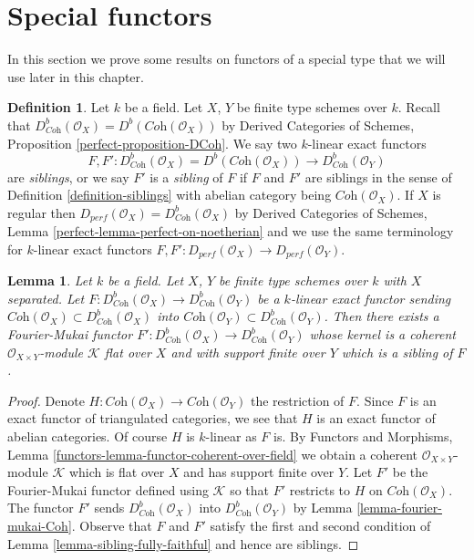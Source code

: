 \documentclass{stacks-project}
\theoremstyle{plain}
\newtheorem{lemma}[subsection]{Lemma}
\theoremstyle{definition}
\newtheorem{definition}[subsection]{Definition}
\theoremstyle{remark}
\numberwithin{equation}{subsection}
\begin{document}
\section{Special functors}
\label{section-special-functors}

\noindent
In this section we prove some results on functors of a special type
that we will use later in this chapter.

\begin{definition}
\label{definition-siblings-geometric}
Let $k$ be a field. Let $X$, $Y$ be finite type schemes over $k$.
Recall that
$D^b_{\textit{Coh}}(\mathcal{O}_X) = D^b(\textit{Coh}(\mathcal{O}_X))$
by Derived Categories of Schemes, Proposition \ref{perfect-proposition-DCoh}.
We say two $k$-linear exact functors
$$
F, F' :
D^b_{\textit{Coh}}(\mathcal{O}_X) = D^b(\textit{Coh}(\mathcal{O}_X))
\longrightarrow
D^b_{\textit{Coh}}(\mathcal{O}_Y)
$$
are {\it siblings}, or we say $F'$ is a {\it sibling} of $F$ if $F$ and $F'$
are siblings in the sense of Definition \ref{definition-siblings}
with abelian category being $\textit{Coh}(\mathcal{O}_X)$.
If $X$ is regular then
$D_{perf}(\mathcal{O}_X) = D^b_{\textit{Coh}}(\mathcal{O}_X)$ by
Derived Categories of Schemes, Lemma \ref{perfect-lemma-perfect-on-noetherian}
and we use the same terminology for $k$-linear exact functors
$F, F' : D_{perf}(\mathcal{O}_X) \to D_{perf}(\mathcal{O}_Y)$.
\end{definition}

\begin{lemma}
\label{lemma-exact-functor-preserving-Coh}
Let $k$ be a field. Let $X$, $Y$ be finite type schemes over $k$ with
$X$ separated. Let
$F : D^b_{\textit{Coh}}(\mathcal{O}_X) \to D^b_{\textit{Coh}}(\mathcal{O}_Y)$
be a $k$-linear exact functor sending
$\textit{Coh}(\mathcal{O}_X) \subset D^b_{\textit{Coh}}(\mathcal{O}_X)$
into
$\textit{Coh}(\mathcal{O}_Y) \subset D^b_{\textit{Coh}}(\mathcal{O}_Y)$.
Then there exists a Fourier-Mukai functor
$F' : D^b_{\textit{Coh}}(\mathcal{O}_X) \to D^b_{\textit{Coh}}(\mathcal{O}_Y)$
whose kernel is a coherent $\mathcal{O}_{X \times Y}$-module $\mathcal{K}$
flat over $X$ and with support finite over $Y$ which is a sibling of $F$.
\end{lemma}

\begin{proof}
Denote $H : \textit{Coh}(\mathcal{O}_X) \to \textit{Coh}(\mathcal{O}_Y)$
the restriction of $F$. Since $F$ is an exact functor of triangulated
categories, we see that $H$ is an exact functor of abelian categories.
Of course $H$ is $k$-linear as $F$ is. By
Functors and Morphisms, Lemma \ref{functors-lemma-functor-coherent-over-field}
we obtain a coherent $\mathcal{O}_{X \times Y}$-module
$\mathcal{K}$ which is flat over $X$ and has support finite over $Y$.
Let $F'$ be the Fourier-Mukai functor defined using $\mathcal{K}$
so that $F'$ restricts to $H$ on $ \textit{Coh}(\mathcal{O}_X)$.
The functor $F'$ sends $D^b_{\textit{Coh}}(\mathcal{O}_X)$
into $D^b_{\textit{Coh}}(\mathcal{O}_Y)$ by
Lemma \ref{lemma-fourier-mukai-Coh}.
Observe that $F$ and $F'$ satisfy the first and second
condition of Lemma \ref{lemma-sibling-fully-faithful} and hence are siblings.
\end{proof}
\end{document}
